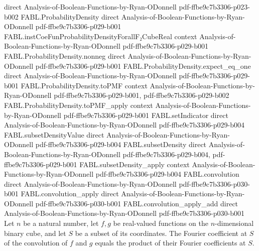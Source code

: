 \begin{theorem}
  {direct}
  {Analysis-of-Boolean-Functions-by-Ryan-ODonnell}
  {pdf-ffbe9c7b3306-p023-b002}
\proofstep
  {FABL.ProbabilityDensity}
  {direct}
  {Analysis-of-Boolean-Functions-by-Ryan-ODonnell}
  {pdf-ffbe9c7b3306-p029-b001}
\proofstep
  {FABL.instCoeFunProbabilityDensityForallF₂CubeReal}
  {context}
  {Analysis-of-Boolean-Functions-by-Ryan-ODonnell}
  {pdf-ffbe9c7b3306-p029-b001}
\proofstep
  {FABL.ProbabilityDensity.nonneg}
  {direct}
  {Analysis-of-Boolean-Functions-by-Ryan-ODonnell}
  {pdf-ffbe9c7b3306-p029-b001}
\proofstep
  {FABL.ProbabilityDensity.expect_eq_one}
  {direct}
  {Analysis-of-Boolean-Functions-by-Ryan-ODonnell}
  {pdf-ffbe9c7b3306-p029-b001}
\proofstep
  {FABL.ProbabilityDensity.toPMF}
  {context}
  {Analysis-of-Boolean-Functions-by-Ryan-ODonnell}
  {pdf-ffbe9c7b3306-p029-b001,
    pdf-ffbe9c7b3306-p029-b002}
\proofstep
  {FABL.ProbabilityDensity.toPMF_apply}
  {context}
  {Analysis-of-Boolean-Functions-by-Ryan-ODonnell}
  {pdf-ffbe9c7b3306-p029-b001}
\proofstep
  {FABL.setIndicator}
  {direct}
  {Analysis-of-Boolean-Functions-by-Ryan-ODonnell}
  {pdf-ffbe9c7b3306-p029-b004}
\proofstep
  {FABL.subsetDensityValue}
  {direct}
  {Analysis-of-Boolean-Functions-by-Ryan-ODonnell}
  {pdf-ffbe9c7b3306-p029-b004}
\proofstep
  {FABL.subsetDensity}
  {direct}
  {Analysis-of-Boolean-Functions-by-Ryan-ODonnell}
  {pdf-ffbe9c7b3306-p029-b004,
    pdf-ffbe9c7b3306-p029-b001}
\proofstep
  {FABL.subsetDensity_apply}
  {context}
  {Analysis-of-Boolean-Functions-by-Ryan-ODonnell}
  {pdf-ffbe9c7b3306-p029-b004}
\proofstep
  {FABL.convolution}
  {direct}
  {Analysis-of-Boolean-Functions-by-Ryan-ODonnell}
  {pdf-ffbe9c7b3306-p030-b001}
\proofstep
  {FABL.convolution_apply}
  {direct}
  {Analysis-of-Boolean-Functions-by-Ryan-ODonnell}
  {pdf-ffbe9c7b3306-p030-b001}
\proofstep
  {FABL.convolution_apply_add}
  {direct}
  {Analysis-of-Boolean-Functions-by-Ryan-ODonnell}
  {pdf-ffbe9c7b3306-p030-b001}
Let $n$ be a natural number, let $f,g$ be real-valued functions on the $n$-dimensional
binary cube, and let $S$ be a subset of its coordinates. The Fourier coefficient at $S$
of the convolution of $f$ and $g$ equals the product of their Fourier coefficients at
$S$.
\end{theorem}
